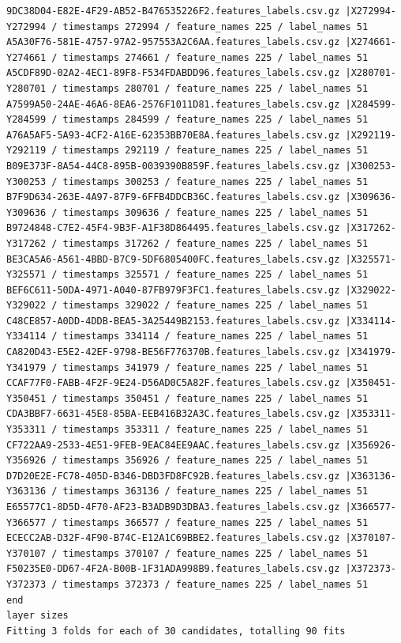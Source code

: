 \documentclass{UoNMCHA}
\numberwithin{equation}{section}
\begin{document}
\begin{lstlisting}[breaklines=true]
9DC38D04-E82E-4F29-AB52-B476535226F2.features_labels.csv.gz |X272994-Y272994 / timestamps 272994 / feature_names 225 / label_names 51
A5A30F76-581E-4757-97A2-957553A2C6AA.features_labels.csv.gz |X274661-Y274661 / timestamps 274661 / feature_names 225 / label_names 51
A5CDF89D-02A2-4EC1-89F8-F534FDABDD96.features_labels.csv.gz |X280701-Y280701 / timestamps 280701 / feature_names 225 / label_names 51
A7599A50-24AE-46A6-8EA6-2576F1011D81.features_labels.csv.gz |X284599-Y284599 / timestamps 284599 / feature_names 225 / label_names 51
A76A5AF5-5A93-4CF2-A16E-62353BB70E8A.features_labels.csv.gz |X292119-Y292119 / timestamps 292119 / feature_names 225 / label_names 51
B09E373F-8A54-44C8-895B-0039390B859F.features_labels.csv.gz |X300253-Y300253 / timestamps 300253 / feature_names 225 / label_names 51
B7F9D634-263E-4A97-87F9-6FFB4DDCB36C.features_labels.csv.gz |X309636-Y309636 / timestamps 309636 / feature_names 225 / label_names 51
B9724848-C7E2-45F4-9B3F-A1F38D864495.features_labels.csv.gz |X317262-Y317262 / timestamps 317262 / feature_names 225 / label_names 51
BE3CA5A6-A561-4BBD-B7C9-5DF6805400FC.features_labels.csv.gz |X325571-Y325571 / timestamps 325571 / feature_names 225 / label_names 51
BEF6C611-50DA-4971-A040-87FB979F3FC1.features_labels.csv.gz |X329022-Y329022 / timestamps 329022 / feature_names 225 / label_names 51
C48CE857-A0DD-4DDB-BEA5-3A25449B2153.features_labels.csv.gz |X334114-Y334114 / timestamps 334114 / feature_names 225 / label_names 51
CA820D43-E5E2-42EF-9798-BE56F776370B.features_labels.csv.gz |X341979-Y341979 / timestamps 341979 / feature_names 225 / label_names 51
CCAF77F0-FABB-4F2F-9E24-D56AD0C5A82F.features_labels.csv.gz |X350451-Y350451 / timestamps 350451 / feature_names 225 / label_names 51
CDA3BBF7-6631-45E8-85BA-EEB416B32A3C.features_labels.csv.gz |X353311-Y353311 / timestamps 353311 / feature_names 225 / label_names 51
CF722AA9-2533-4E51-9FEB-9EAC84EE9AAC.features_labels.csv.gz |X356926-Y356926 / timestamps 356926 / feature_names 225 / label_names 51
D7D20E2E-FC78-405D-B346-DBD3FD8FC92B.features_labels.csv.gz |X363136-Y363136 / timestamps 363136 / feature_names 225 / label_names 51
E65577C1-8D5D-4F70-AF23-B3ADB9D3DBA3.features_labels.csv.gz |X366577-Y366577 / timestamps 366577 / feature_names 225 / label_names 51
ECECC2AB-D32F-4F90-B74C-E12A1C69BBE2.features_labels.csv.gz |X370107-Y370107 / timestamps 370107 / feature_names 225 / label_names 51
F50235E0-DD67-4F2A-B00B-1F31ADA998B9.features_labels.csv.gz |X372373-Y372373 / timestamps 372373 / feature_names 225 / label_names 51
end
layer sizes
Fitting 3 folds for each of 30 candidates, totalling 90 fits

\end{lstlisting}
\end{document}
